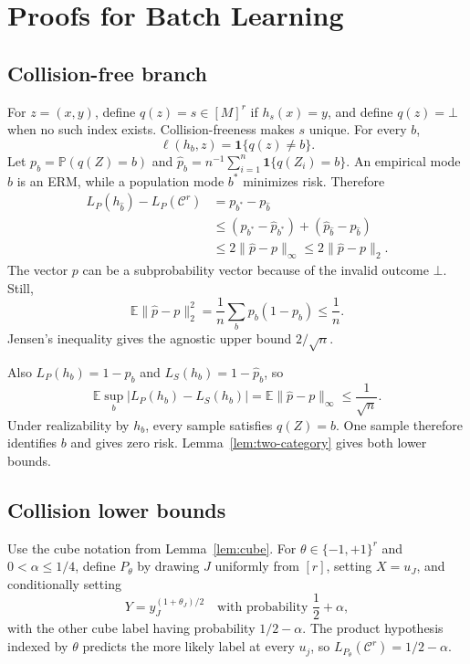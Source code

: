 \documentclass[twoside]{article}
\newcommand{\E}{\mathbb E}
\newcommand{\Pp}{\mathbb P}
\newcommand{\C}{\mathcal C}
\begin{document}
\section{Proofs for Batch Learning}
\label{app:batch}

\subsection{Collision-free branch}

For $z=(x,y)$, define $q(z)=s\in[M]^r$ if $h_s(x)=y$, and define $q(z)=\bot$ when no such index exists. Collision-freeness makes $s$ unique. For every $b$,
\[
 \ell(h_b,z)=\mathbf1\{q(z)\neq b\}.
\]
Let $p_b=\Pp(q(Z)=b)$ and $\widehat p_b=n^{-1}\sum_{i=1}^n\mathbf1\{q(Z_i)=b\}$. An empirical mode $\widehat b$ is an ERM, while a population mode $b^*$ minimizes risk. Therefore
\begin{align*}
 L_P(h_{\widehat b})-L_P(\C^r)
 &=p_{b^*}-p_{\widehat b}\\
 &\leq(p_{b^*}-\widehat p_{b^*})+(\widehat p_{\widehat b}-p_{\widehat b})\\
 &\leq2\|\widehat p-p\|_\infty
 \leq2\|\widehat p-p\|_2.
\end{align*}
The vector $p$ can be a subprobability vector because of the invalid outcome $\bot$. Still,
\[
 \E\|\widehat p-p\|_2^2
 =\frac1n\sum_b p_b(1-p_b)\leq\frac1n.
\]
Jensen's inequality gives the agnostic upper bound $2/\sqrt n$.

Also $L_P(h_b)=1-p_b$ and $L_S(h_b)=1-\widehat p_b$, so
\[
 \E\sup_b|L_P(h_b)-L_S(h_b)|
 =\E\|\widehat p-p\|_\infty\leq\frac1{\sqrt n}.
\]
Under realizability by $h_b$, every sample satisfies $q(Z)=b$. One sample therefore identifies $b$ and gives zero risk. Lemma~\ref{lem:two-category} gives both lower bounds.

\subsection{Collision lower bounds}

Use the cube notation from Lemma~\ref{lem:cube}. For $\theta\in\{-1,+1\}^r$ and $0<\alpha\leq1/4$, define $P_\theta$ by drawing $J$ uniformly from $[r]$, setting $X=u_J$, and conditionally setting
\[
 Y=y_J^{(1+\theta_J)/2}\quad\text{with probability }\frac12+\alpha,
\]
with the other cube label having probability $1/2-\alpha$. The product hypothesis indexed by $\theta$ predicts the more likely label at every $u_j$, so $L_{P_\theta}(\C^r)=1/2-\alpha$.
\end{document}
